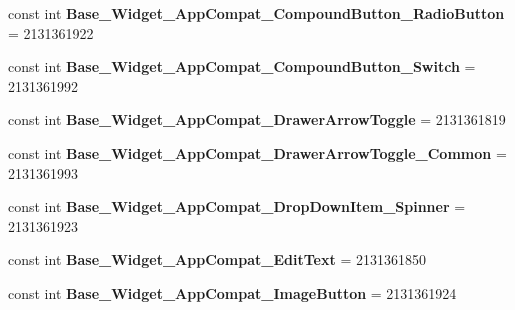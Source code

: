 \begin{DoxyCompactItemize}
\mbox{\label{class_sample_app_1_1_droid_1_1_resource_1_1_style_ae451e54eb59cb19f95aa7645f0cc8e34}} 
const int {\bfseries Base\+\_\+\+Widget\+\_\+\+App\+Compat\+\_\+\+Compound\+Button\+\_\+\+Radio\+Button} = 2131361922
\item 
\mbox{\label{class_sample_app_1_1_droid_1_1_resource_1_1_style_a8315a792de7483a64de98721623736c5}} 
const int {\bfseries Base\+\_\+\+Widget\+\_\+\+App\+Compat\+\_\+\+Compound\+Button\+\_\+\+Switch} = 2131361992
\item 
\mbox{\label{class_sample_app_1_1_droid_1_1_resource_1_1_style_ac14bd581c88d431604e88e1f61f5ffed}} 
const int {\bfseries Base\+\_\+\+Widget\+\_\+\+App\+Compat\+\_\+\+Drawer\+Arrow\+Toggle} = 2131361819
\item 
\mbox{\label{class_sample_app_1_1_droid_1_1_resource_1_1_style_aada269ec38cd59c37da300f2b94b903f}} 
const int {\bfseries Base\+\_\+\+Widget\+\_\+\+App\+Compat\+\_\+\+Drawer\+Arrow\+Toggle\+\_\+\+Common} = 2131361993
\item 
\mbox{\label{class_sample_app_1_1_droid_1_1_resource_1_1_style_ad35222e8309d515bd7f86b60b37ecfb2}} 
const int {\bfseries Base\+\_\+\+Widget\+\_\+\+App\+Compat\+\_\+\+Drop\+Down\+Item\+\_\+\+Spinner} = 2131361923
\item 
\mbox{\label{class_sample_app_1_1_droid_1_1_resource_1_1_style_af057723490623841043ffd1bf6628daf}} 
const int {\bfseries Base\+\_\+\+Widget\+\_\+\+App\+Compat\+\_\+\+Edit\+Text} = 2131361850
\item 
\mbox{\label{class_sample_app_1_1_droid_1_1_resource_1_1_style_a3a516fd7e50b3eed3587c9b6a391c42b}} 
const int {\bfseries Base\+\_\+\+Widget\+\_\+\+App\+Compat\+\_\+\+Image\+Button} = 2131361924
\item 
\mbox{\label{class_sample_app_1_1_droid_1_1_resource_1_1_style_ac02f0e133ee907fbaf6d25d81f64424f}} 

\end{DoxyCompactItemize}
